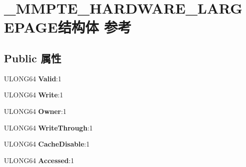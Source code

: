 \hypertarget{struct___m_m_p_t_e___h_a_r_d_w_a_r_e___l_a_r_g_e_p_a_g_e}{}\section{\+\_\+\+M\+M\+P\+T\+E\+\_\+\+H\+A\+R\+D\+W\+A\+R\+E\+\_\+\+L\+A\+R\+G\+E\+P\+A\+G\+E结构体 参考}
\label{struct___m_m_p_t_e___h_a_r_d_w_a_r_e___l_a_r_g_e_p_a_g_e}
\subsection*{Public 属性}
\begin{DoxyCompactItemize}
\item 
\mbox{\label{struct___m_m_p_t_e___h_a_r_d_w_a_r_e___l_a_r_g_e_p_a_g_e_a910868db84467d601dbdb186f2ff7ddb}} 
U\+L\+O\+N\+G64 {\bfseries Valid}\+:1
\item 
\mbox{\label{struct___m_m_p_t_e___h_a_r_d_w_a_r_e___l_a_r_g_e_p_a_g_e_a77fbf6a9de3c5deae6e63c1404606c71}} 
U\+L\+O\+N\+G64 {\bfseries Write}\+:1
\item 
\mbox{\label{struct___m_m_p_t_e___h_a_r_d_w_a_r_e___l_a_r_g_e_p_a_g_e_a36970c0a1856b1d8f2b5f6a65a3669a5}} 
U\+L\+O\+N\+G64 {\bfseries Owner}\+:1
\item 
\mbox{\label{struct___m_m_p_t_e___h_a_r_d_w_a_r_e___l_a_r_g_e_p_a_g_e_a9fe1e9f606ab507c6a80738ba7792b3f}} 
U\+L\+O\+N\+G64 {\bfseries Write\+Through}\+:1
\item 
\mbox{\label{struct___m_m_p_t_e___h_a_r_d_w_a_r_e___l_a_r_g_e_p_a_g_e_a7bc282af9698379fb74bc8f6b8a5e67a}} 
U\+L\+O\+N\+G64 {\bfseries Cache\+Disable}\+:1
\item 
\mbox{\label{struct___m_m_p_t_e___h_a_r_d_w_a_r_e___l_a_r_g_e_p_a_g_e_a69ab634ff98bc91f4797a914cb8f386b}} 
U\+L\+O\+N\+G64 {\bfseries Accessed}\+:1

\end{DoxyCompactItemize}
